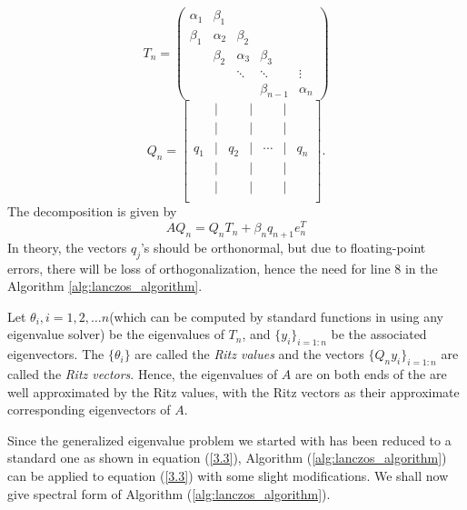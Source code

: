 \[T_n = \begin{pmatrix}
			\alpha_1 & \beta_1 & & & \\\beta_1 & \alpha_2 & \beta_2 & & \\ & \beta_2 & \alpha_3 & \beta_3 & \\ & & \ddots & \ddots & \vdots \\ & & & \beta_{n-1} & \alpha_n
		\end{pmatrix}\] 
	\[
	Q_n = 
	\begin{bmatrix}
		 & \big| &  & \big| &  & \big| &  \\
		 & \big| &  & \big| &  & \big| &  \\
		 q_1 & \big| & q_2 & \big| & \cdots & \big| & q_n \\
		 & \big| &  & \big| &  & \big| &  \\
		 & \big| &  & \big| &  & \big| &  \\
	\end{bmatrix}.
	\]
The decomposition is given by
\begin{equation}
	AQ_n = Q_nT_n + \beta_{n}q_{n+1}e_n^T
\end{equation}
In theory, the vectors $q_j$'s should be orthonormal, but due to floating-point errors, there will be loss of orthogonalization, hence the need for line 8 in the Algorithm \ref{alg:lanczos_algorithm}.\par 
Let $\theta_i, i = 1,2, \ldots n$(which can be computed by standard functions in using any eigenvalue solver) be the eigenvalues of $T_n$, and $\{y_i\}_{i = 1 : n}$ be the associated eigenvectors. The $\{\theta_i\}$ are called the \textit{Ritz values} and the vectors $\{Q_ny_i\}_{i = 1 : n}$ are called the \textit{Ritz vectors}. Hence, the eigenvalues of $A$ are on both ends of the are well approximated by the Ritz values, with the Ritz vectors as their approximate corresponding eigenvectors of $A$.\par
Since the generalized eigenvalue problem we started with has been reduced to a standard one as shown in equation (\ref{3.3}), Algorithm (\ref{alg:lanczos_algorithm}) can be applied to equation (\ref{3.3}) with some slight modifications. We shall now give spectral form of Algorithm (\ref{alg:lanczos_algorithm}).\\
